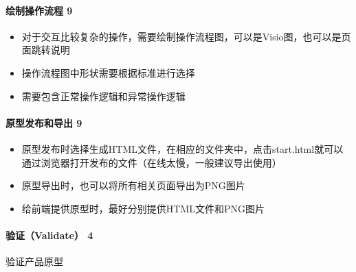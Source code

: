 \documentclass[letterpaper,11pt,english]{sphinxmanual}
\begin{document}
\paragraph{绘制操作流程 9\sphinxfootnotemark[537]}
\label{\detokenize{chapter_knowledge/prototype_design:id16}}%
\begin{footnotetext}[537]\sphinxAtStartFootnote
{}
%
\end{footnotetext}\ignorespaces \begin{itemize}
\item {} 
对于交互比较复杂的操作，需要绘制操作流程图，可以是Visio图，也可以是页面跳转说明

\item {} 
操作流程图中形状需要根据标准进行选择

\item {} 
需要包含正常操作逻辑和异常操作逻辑

\end{itemize}


\paragraph{原型发布和导出 9\sphinxfootnotemark[538]}
\label{\detokenize{chapter_knowledge/prototype_design:id17}}%
\begin{footnotetext}[538]\sphinxAtStartFootnote
{}
%
\end{footnotetext}\ignorespaces \begin{itemize}
\item {} 
原型发布时选择生成HTML文件，在相应的文件夹中，点击start.html就可以通过浏览器打开发布的文件（在线太慢，一般建议导出使用）

\item {} 
原型导出时，也可以将所有相关页面导出为PNG图片

\item {} 
给前端提供原型时，最好分别提供HTML文件和PNG图片

\end{itemize}


\paragraph{验证（Validate） 4\sphinxfootnotemark[539]}
\label{\detokenize{chapter_knowledge/prototype_design:validate-4}}%
\begin{footnotetext}[539]\sphinxAtStartFootnote
{}
%
\end{footnotetext}\ignorespaces 
验证产品原型
\end{document}
